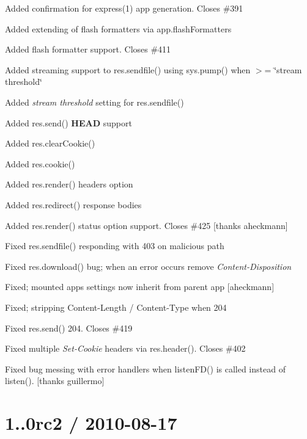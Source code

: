 {\ttfamily 
\begin{DoxyItemize}
\item Added confirmation for {\ttfamily express(1)} app generation. Closes \#391
\item Added extending of flash formatters via {\ttfamily app.\+flash\+Formatters}
\item Added flash formatter support. Closes \#411
\item Added streaming support to {\ttfamily res.\+sendfile()} using {\ttfamily sys.\+pump()} when $>$= \char`\"{}stream threshold\char`\"{}
\item Added {\itshape stream threshold} setting for {\ttfamily res.\+sendfile()}
\item Added {\ttfamily res.\+send()} {\bfseries H\+E\+AD} support
\item Added {\ttfamily res.\+clear\+Cookie()}
\item Added {\ttfamily res.\+cookie()}
\item Added {\ttfamily res.\+render()} headers option
\item Added {\ttfamily res.\+redirect()} response bodies
\item Added {\ttfamily res.\+render()} status option support. Closes \#425 \mbox{[}thanks aheckmann\mbox{]}
\item Fixed {\ttfamily res.\+sendfile()} responding with 403 on malicious path
\item Fixed {\ttfamily res.\+download()} bug; when an error occurs remove {\itshape Content-\/\+Disposition}
\item Fixed; mounted apps settings now inherit from parent app \mbox{[}aheckmann\mbox{]}
\item Fixed; stripping Content-\/\+Length / Content-\/\+Type when 204
\item Fixed {\ttfamily res.\+send()} 204. Closes \#419
\item Fixed multiple {\itshape Set-\/\+Cookie} headers via {\ttfamily res.\+header()}. Closes \#402
\item Fixed bug messing with error handlers when {\ttfamily listen\+F\+D()} is called instead of {\ttfamily listen()}. \mbox{[}thanks guillermo\mbox{]}
\end{DoxyItemize}}

{\ttfamily \section*{1..\+0rc2 / 2010-\/08-\/17 }}

